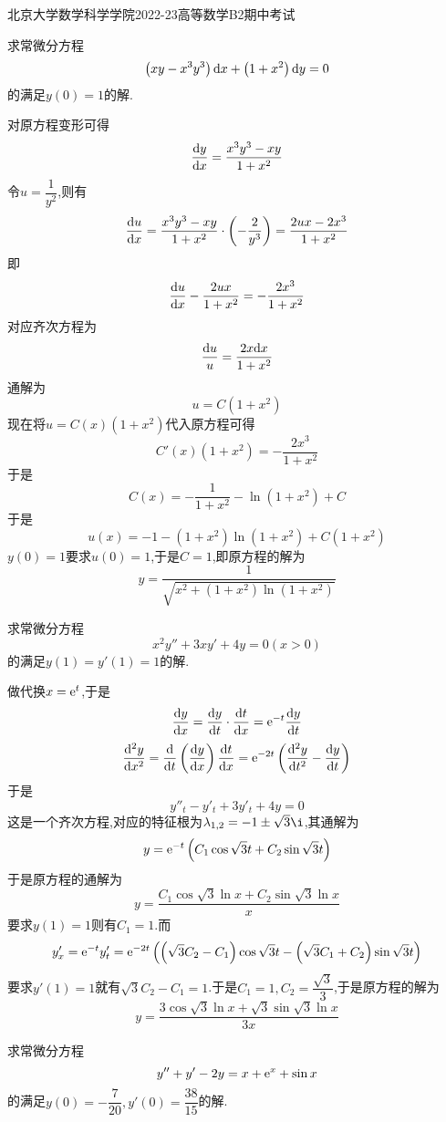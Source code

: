 \documentclass{ctexart}
\begin{document}
\pagestyle{empty}
\begin{center}\Large
    北京大学数学科学学院2022-23高等数学B2期中考试
\end{center}
\begin{problem}[1.(10\songti{分})]
    求常微分方程
    \[\left(xy-x^3y^3\right)\mathrm{d} x+\left(1+x^2\right)\mathrm{d} y=0\]
    的满足$y(0)=1$的解.
\end{problem}
\begin{solution}
    对原方程变形可得
    \[\dfrac{\mathrm{d} y}{\mathrm{d} x}=\dfrac{x^3y^3-xy}{1+x^2}\]
    令$u=\dfrac{1}{y^2}$,则有
    \[\dfrac{\mathrm{d} u}{\mathrm{d} x}=\dfrac{x^3y^3-xy}{1+x^2}\cdot\left(-\dfrac{2}{y^3}\right)=\dfrac{2ux-2x^3}{1+x^2}\]
    即
    \[\dfrac{\mathrm{d} u}{\mathrm{d} x}-\dfrac{2ux}{1+x^2}=-\dfrac{2x^3}{1+x^2}\]
    对应齐次方程为
    \[\dfrac{\mathrm{d} u}{u}=\dfrac{2x\mathrm{d} x}{1+x^2}\]
    通解为
    \[u=C(1+x^2)\]
    现在将$u=C(x)\left(1+x^2\right)$代入原方程可得
    \[C'(x)\left(1+x^2\right)=-\dfrac{2x^3}{1+x^2}\]
    于是
    \[C(x)=-\dfrac{1}{1+x^2}-\ln(1+x^2)+C\]
    于是
    \[u(x)=-1-\left(1+x^2\right)\ln(1+x^2)+C\left(1+x^2\right)\]
    $y(0)=1$要求$u(0)=1$,于是$C=1$,即原方程的解为
    \[y=\dfrac{1}{\sqrt{x^2+\left(1+x^2\right)\ln\left(1+x^2\right)}}\]
\end{solution}
\begin{problem}[2.(10\songti{分})]
    求常微分方程
    \[x^2y''+3xy'+4y=0(x>0)\]
    的满足$y(1)=y'(1)=1$的解.
\end{problem}
\begin{solution}
    做代换$x=\mathrm{e}^t$,于是
    \[\dfrac{\mathrm{d} y}{\mathrm{d} x}=\dfrac{\mathrm{d} y}{\mathrm{d} t}\cdot\dfrac{\mathrm{d} t}{\mathrm{d} x}=\mathrm{e}^{-t}\dfrac{\mathrm{d} y}{\mathrm{d} t}\]
    \[\dfrac{\mathrm{d}^2y}{\mathrm{d} x^2}=\dfrac{\mathrm{d}}{\mathrm{d} t}\left(\dfrac{\mathrm{d} y}{\mathrm{d} x}\right)\dfrac{\mathrm{d} t}{\mathrm{d} x}=\mathrm{e}^{-2t}\left(\dfrac{\mathrm{d}^2y}{\mathrm{d} t^2}-\dfrac{\mathrm{d} y}{\mathrm{d} t}\right)\]
    于是
    \[y''_t-y'_t+3y'_t+4y=0\]
    这是一个齐次方程,对应的特征根为$\lambda_{1,2}=-1\pm\sqrt3\i$,其通解为
    \[y=\mathrm{e}^{-t}\left(C_1\cos\sqrt3t+C_2\sin\sqrt3t\right)\]
    于是原方程的通解为
    \[y=\dfrac{C_1\cos\sqrt3\ln x+C_2\sin\sqrt3\ln x}{x}\]
    要求$y(1)=1$则有$C_1=1$.而
    \[y'_x=\mathrm{e}^{-t}y'_t=\mathrm{e}^{-2t}\left(\left(\sqrt3C_2-C_1\right)\cos\sqrt3t-\left(\sqrt3C_1+C_2\right)\sin\sqrt3t\right)\]
    要求$y'(1)=1$就有$\sqrt3C_2-C_1=1$.于是$C_1=1,C_2=\dfrac{\sqrt3}{3}$,于是原方程的解为
    \[y=\dfrac{3\cos\sqrt3\ln x+\sqrt{3}\sin\sqrt3\ln x}{3x}\]
\end{solution}
\begin{problem}[3.(10\songti{分})]
    求常微分方程
    \[y''+y'-2y=x+\mathrm{e}^x+\sin x\]
    的满足$y(0)=-\dfrac{7}{20},y'(0)=\dfrac{38}{15}$的解.
\end{problem}
\end{document}
